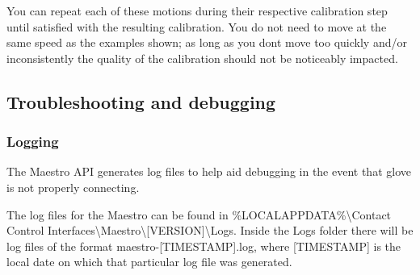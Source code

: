 You can repeat each of these motions during their respective calibration step until satisfied with the resulting calibration. You do not need to move at the same speed as the examples shown; as long as you don\textquotesingle{}t move too quickly and/or inconsistently the quality of the calibration should not be noticeably impacted.

\subsection*{Troubleshooting and debugging}

\subsubsection*{Logging}

The Maestro A\+PI generates log files to help aid debugging in the event that glove is not properly connecting.

The log files for the Maestro can be found in {\ttfamily \%L\+O\+C\+A\+L\+A\+P\+P\+D\+A\+TA\%\textbackslash{}Contact Control Interfaces\textbackslash{}Maestro\textbackslash{}\mbox{[}V\+E\+R\+S\+I\+ON\mbox{]}\textbackslash{}Logs}. Inside the {\ttfamily Logs} folder there will be log files of the format {\ttfamily maestro-\/\mbox{[}T\+I\+M\+E\+S\+T\+A\+MP\mbox{]}.log}, where {\ttfamily \mbox{[}T\+I\+M\+E\+S\+T\+A\+MP\mbox{]}} is the local date on which that particular log file was generated.

